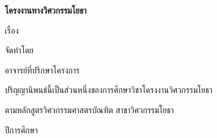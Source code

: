 \thispagestyle{empty}
\begin{center}
  \vspace*{1cm}

  {\Large\bfseries โครงงานทางวิศวกรรมโยธา}

  \vspace{1.5cm}
  {\large เรื่อง}

  \vspace{1cm}
  \begin{minipage}{0.88\textwidth}
    \begin{center}
      {\large\bfseries\thesistitleTH\par}
    \end{center}
  \end{minipage}

  \vspace{1.8cm}
  \begin{minipage}{0.88\textwidth}
    \begin{center}
      {\large\bfseries\thesistitleEN\par}
    \end{center}
  \end{minipage}

  \vspace{2.2cm}
  จัดทำโดย

  \vspace{0.5cm}
  {\large \authorname}

  {\large \studentid}

  \vspace{1.8cm}
  อาจารย์ที่ปรึกษาโครงการ

  \vspace{0.4cm}
  {\large \advisor}

  \vspace{1.8cm}
  ปริญญานิพนธ์นี้เป็นส่วนหนึ่งของการศึกษาวิชาโครงงานวิศวกรรมโยธา

  ตามหลักสูตรวิศวกรรมศาสตรบัณฑิต สาขาวิศวกรรมโยธา

  \faculty

  \university

  ปีการศึกษา \academicyear
\end{center}
\newpage
